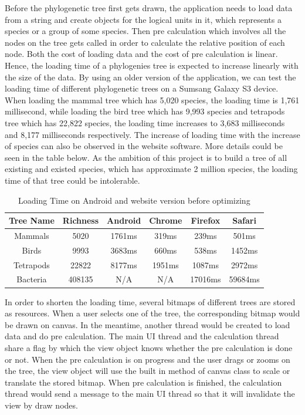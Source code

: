 \documentclass[MSc]{icldt}
\begin{document}
Before the phylogenetic tree first gets drawn, the application needs to load data from a string and create objects for the logical units in it, which represents a species or a group of some species. Then pre calculation which involves all the nodes on the tree gets called in order to calculate the relative position of each node. Both the cost of loading data and the cost of pre calculation is linear. Hence, the loading time of a phylogenies tree is expected to increase linearly with the size of the data. By using an older version of the application, we can test the loading time of different phylogenetic trees on a Sumsang Galaxy S3 device. When loading the mammal tree which has 5,020 species, the loading time is 1,761 millisecond, while loading the bird tree which has 9,993 species and tetrapods tree which has 22,822 species, the loading time increases to 3,683 milliseconds and 8,177 milliseconds respectively. The increase of loading time with the increase of species can also be observed in the website software. More details could be seen in the table below. As the ambition of this project is to build a tree of all existing and existed species, which has approximate 2 million species, the loading time of that tree could be intolerable.

\begin{table} [H]
	\centering %
	\begin{tabular}{|c c c c c c|} %
		\hline %
		Tree Name & Richness  & Android & Chrome & Firefox & Safari\\%
		\hline  %
		Mammals & 5020 & 1761ms & 319ms & 239ms & 501ms \\  %
		\hline
		Birds & 9993 & 3683ms & 660ms & 538ms & 1452ms \\
		\hline
		Tetrapods & 22822 & 8177ms & 1951ms & 1087ms & 2972ms\\ 
		\hline %
		Bacteria & 408135 & N/A & N/A & 17016ms  & 59684ms\\ [1ex] %
		\hline
	\end{tabular}
	\label{table:nonlin} %
	\caption{Loading Time on Android and website version before optimizing} %
\end{table}

In order to shorten the loading time, several bitmaps of different trees are stored as resources. When a user selects one of the tree, the corresponding bitmap would be drawn on canvas. In the meantime, another thread would be created to load data and do pre calculation. The main UI thread and the calculation thread share a flag by which the view object knows whether the pre calculation is done or not. When the pre calculation is on progress and the user drags or zooms on the tree, the view object will use the built in method of canvas class to scale or translate the stored bitmap. When pre calculation is finished, the calculation thread would send a message to the main UI thread so that it will invalidate the view by draw nodes.
\end{document}
